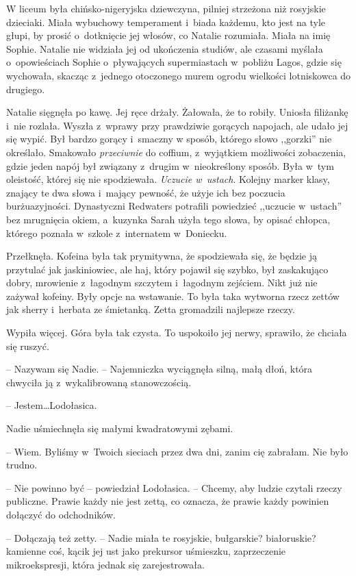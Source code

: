 \documentclass[oneside,polish,11pt,sfheadings]{mwbk}
\begin{document}
W liceum była chińsko-nigeryjska dziewczyna, pilniej strzeżona niż
rosyjskie dzieciaki. Miała wybuchowy temperament i~biada każdemu, kto
jest na tyle głupi, by prosić o~dotknięcie jej włosów, co Natalie
rozumiała. Miała na imię Sophie. Natalie nie widziała jej od ukończenia
studiów, ale czasami myślała o~opowieściach Sophie o~pływających
supermiastach w~pobliżu Lagos, gdzie się wychowała, skacząc z~jednego
otoczonego murem ogrodu wielkości lotniskowca do drugiego.

Natalie sięgnęła po kawę. Jej ręce drżały. Żałowała, że to robiły.
Uniosła filiżankę i~nie rozlała. Wyszła z~wprawy przy prawdziwie
gorących napojach, ale udało jej się wypić. Był bardzo gorący i~smaczny
w sposób, którego słowo ,,gorzki'' nie określało. Smakowało
\textit{przeciwnie} do coffium, z~wyjątkiem możliwości zobaczenia, gdzie
jeden napój był związany z~drugim w~nieokreślony sposób. Była w~tym
oleistość, której się nie spodziewała. \textit{Uczucie w~ustach}. Kolejny
marker klasy, znający te dwa słowa i~mający pewność, że użyje ich bez
poczucia burżuazyjności. Dynastyczni Redwaters potrafili powiedzieć
,,uczucie w~ustach'' bez mrugnięcia okiem, a~kuzynka Sarah użyła tego
słowa, by opisać chłopca, którego poznała w~szkole z~internatem w~Doniecku.

Przełknęła. Kofeina była tak prymitywna, że spodziewała się, że będzie
ją przytulać jak jaskiniowiec, ale haj, który pojawił się szybko, był
zaskakująco dobry, mrowienie z~łagodnym szczytem i~łagodnym zejściem.
Nikt już nie zażywał kofeiny. Były opcje na wstawanie. To była taka
wytworna rzecz zettów jak sherry i~herbata ze śmietanką. Zetta
gromadzili najlepsze rzeczy.

Wypiła więcej. Góra była tak czysta. To uspokoiło jej nerwy, sprawiło,
że chciała się ruszyć.

-- Nazywam się Nadie. -- Najemniczka wyciągnęła silną, małą dłoń, która
chwyciła ją z~wykalibrowaną stanowczością.

-- Jestem\ldots  Lodołasica.

Nadie uśmiechnęła się małymi kwadratowymi zębami. 

-- Wiem. Byliśmy w~Twoich sieciach przez dwa dni, zanim cię zabrałam. Nie było trudno.

-- Nie powinno być -- powiedział Lodołasica. -- Chcemy, aby ludzie czytali
rzeczy publiczne. Prawie każdy nie jest zettą, co oznacza, że prawie
każdy powinien dołączyć do odchodników.

-- Dołączają też zetty. -- Nadie miała te rosyjskie, bułgarskie?
białoruskie? kamienne coś, kącik jej ust jako prekursor uśmieszku,
zaprzeczenie mikroekspresji, która jednak się zarejestrowała.
\end{document}
